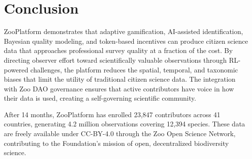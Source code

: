 \section{Conclusion}

\label{sec:conclusion}

ZooPlatform demonstrates that adaptive gamification, AI-assisted
identification, Bayesian quality modeling, and token-based incentives
can produce citizen science data that approaches professional survey
quality at a fraction of the cost. By directing observer effort toward
scientifically valuable observations through RL-powered challenges,
the platform reduces the spatial, temporal, and taxonomic biases that
limit the utility of traditional citizen science data. The integration
with Zoo DAO governance ensures that active contributors have voice in
how their data is used, creating a self-governing scientific community.

After 14 months, ZooPlatform has enrolled 23{,}847 contributors across
41 countries, generating 4.2 million observations covering 12{,}394
species. These data are freely available under CC-BY-4.0 through the Zoo
Open Science Network, contributing to the Foundation's mission of open,
decentralized biodiversity science.





